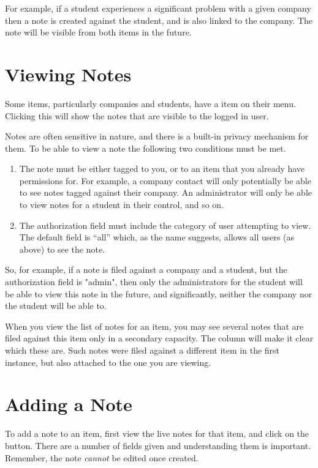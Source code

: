 \documentclass[12 pt]{book}
\begin{document}
For example, if a student experiences a significant problem with a given 
company then a note is created against the student, and is also linked to the
company. The note will be visible from both items in the future.

\section{Viewing Notes}

Some items, particularly companies and students, have a  item
on their menu. Clicking this will show the notes that are visible to the logged
in user.

Notes are often sensitive in nature, and there is a built-in privacy mechanism
for them. To be able to view a note the following two conditions must be met.

\begin{enumerate}
\item The note must be either tagged to you, or to an item that you already
have permissions for. For example, a company contact will only potentially be
able to see notes tagged against their company. An administrator will
only be able to view notes for a student in their control, and so on.
\item The authorization field must include the category of user attempting to
view. The default field is ``all'' which, as the name suggests, allows all
users (as above) to see the note.
\end{enumerate}

So, for example, if a note is filed against a company and a student, but the
authorization field is "admin", then only the administrators for the student
will be able to view this note in the future, and significantly, neither the
company nor the student will be able to.

When you view the list of notes for an item, you may see several notes that
are filed against this item only in a secondary capacity. The 
column will make it clear which these are. Such notes were filed against a
different item in the first instance, but also attached to the one you are
viewing.

\section{Adding a Note}

To add a note to an item, first view the live notes for that item, and click on
the  button. There are a number of fields given and understanding
them is important. Remember, the note \emph{cannot} be edited once created.
\end{document}
